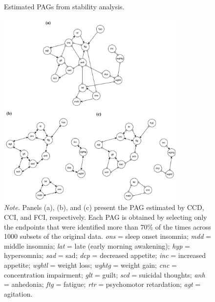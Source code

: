 \documentclass[twoside, 11pt]{article}
\begin{document}
\begin{appendices}
\vspace{2.6mm}
\begin{figure}[!htbp]
    \centering
        \caption{Estimated PAGs from stability analysis.}
        \includegraphics[width=0.83\textwidth]{figures/FigI1.pdf}
        \vspace{1mm}
        \caption*{\small{\textit{Note.} Panels (a), (b), and (c) present the PAG estimated by CCD, CCI, and FCI, respectively. Each PAG is obtained by selecting only the endpoints that were identified more than 70\% of the times across 1000 subsets of the original data. \textit{ons} = sleep onset insomnia; \textit{mdd} = middle insomnia; \textit{lat} = late (early morning awakening); \textit{hyp} = hypersomnia; \textit{sad} = sad; \textit{dcp} = decreased appetite; \textit{inc} = increased appetite; \textit{wghtl} = weight loss; \textit{wghtg} = weight gain; \textit{cnc} = concentration impairment; \textit{glt} = guilt; \textit{scd} = suicidal thoughts; \textit{anh} = anhedonia; \textit{ftg} = fatigue; \textit{rtr} = psychomotor retardation; \textit{agt} = agitation.}}
    \label{fig:I1}
\end{figure}






\end{appendices}
\end{document}
